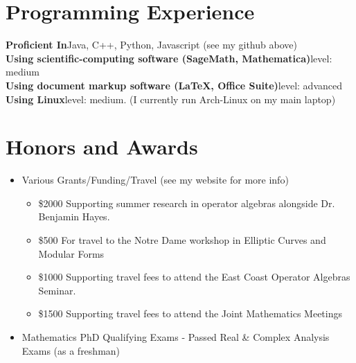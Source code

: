 \documentclass[12pt,letterpaper,sans]{moderncv}
\begin{document}
\section{Programming Experience}
\textbf{Proficient In}\quad Java, C++, Python, Javascript (see my github above) \\
\textbf{Using scientific-computing software (SageMath, Mathematica)}\quad level: medium \\
\textbf{Using document markup software (\LaTeX, Office Suite)}\quad level: advanced \\
\textbf{Using Linux}\quad level: medium. (I currently run Arch-Linux on my main laptop)

\section{Honors and Awards}
\begin{itemize}
  \item Various Grants/Funding/Travel (see my website for more info)
  \begin{itemize}
    \item \$2000 Supporting summer research in operator algebras alongside Dr. Benjamin Hayes.
    \item \$500 For travel to the Notre Dame workshop in Elliptic Curves and Modular Forms
    \item \$1000 Supporting travel fees to attend the East Coast Operator Algebras Seminar. 
    \item \$1500 Supporting travel fees to attend the Joint Mathematics Meetings
  \end{itemize}
  \item Mathematics PhD Qualifying Exams - Passed Real \& Complex Analysis Exams (as a freshman)


  
\end{itemize}
\end{document}
